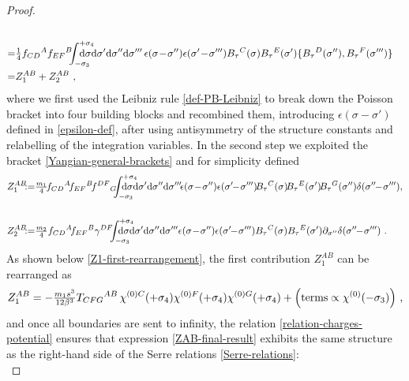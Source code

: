 \documentclass[12pt]{article}
\numberwithin{equation}{section}
\begin{document}
\begin{proof}
\begin{align}
\notag \\
=&\tfrac{1}{4}f_{CD}{}^{A}f_{EF}{}^{B}\!\!\!\int_{-\sigma_{3}}^{+\sigma_{4}}\!\!\!\!\!\!\!\!\!\!\mathrm{d}\sigma\mathrm{d}\sigma' \mathrm{d}\sigma'' \mathrm{d}\sigma''' \, \epsilon(\sigma\!-\!\sigma'')\epsilon(\sigma'\!-\!\sigma''')B_{\tau}{}^{C}(\sigma)B_{\tau}{}^{E}(\sigma')\{B_{\tau}{}^{D}(\sigma''),B_{\tau}{}^{F}(\sigma''')\}
\notag\\
=&Z_{1}^{AB}+Z_{2}^{AB} \,\, ,
\end{align}
where we first used the Leibniz rule \eqref{def-PB-Leibniz} to break down the Poisson bracket into four building blocks and recombined them, introducing $\epsilon(\sigma-\sigma')$ defined in \eqref{epsilon-def}, after using antisymmetry of the structure constants and relabelling of the integration variables. In the second step we exploited the bracket \eqref{Yangian-general-brackets} and for simplicity defined 
\begin{align}\label{Z1-Z2-def}
Z_{1}^{AB}\!\!\!:=&\tfrac{m_{1}}{4}\!f_{CD}{}^{A}\!f_{EF}{}^{B}\!f^{DF}{}_{G}\!\!\!\int_{-\sigma_{3}}^{+\sigma_{4}}\!\!\!\!\!\!\!\!\!\!\!\mathrm{d}\sigma\mathrm{d}\sigma' \mathrm{d}\sigma'' \mathrm{d}\sigma'''  \!\epsilon(\sigma\!-\!\sigma'')\epsilon(\sigma'\!\!-\!\sigma''')\!B_{\tau}{}^{C}(\sigma)\!B_{\tau}{}^{E}(\sigma')\!B_{\tau}{}^{G}(\sigma'')\delta(\sigma''\!\!-\!\sigma''') ,
\notag \\
\\
Z_{2}^{AB}\!\!\!:=&\tfrac{m_{2}}{4}f_{CD}{}^{A}\!f_{EF}{}^{B}\gamma^{DF}\!\!\!\int_{-\sigma_{3}}^{+\sigma_{4}}\!\!\!\!\!\!\!\!\!\!\!\mathrm{d}\sigma\mathrm{d}\sigma' \mathrm{d}\sigma''\mathrm{d}\sigma'''   \epsilon(\sigma\!-\!\sigma'')\epsilon(\sigma'\!\!-\!\sigma''')B_{\tau}{}^{C}(\sigma)B_{\tau}{}^{E}(\sigma')\partial_{\sigma''}\delta(\sigma''\!\!-\!\sigma''') \,\, .
\notag 
\end{align}
As shown below \eqref{Z1-first-rearrangement}, the first contribution $Z_{1}^{AB}$ can be rearranged as 
\begin{equation}\label{ZAB-final-result}
Z_{1}^{AB}=-\tfrac{m_{1}s^3}{12\beta^3}T_{CFG}{}^{AB} \, \chi^{(0)C}(+\sigma_{4}) \chi^{(0)F}(+\sigma_{4}) \chi^{(0)G}(+\sigma_{4}) +\Bigl(\text{terms}\propto\chi^{(0)}(-\sigma_{3})\Bigr) \,\, ,
\end{equation}
and once all boundaries are sent to infinity, the relation \eqref{relation-charges-potential} ensures that expression \eqref{ZAB-final-result} exhibits the same structure as the right-hand side of the Serre relations \eqref{Serre-relations}:
\begin{equation}

\end{equation}
\end{proof}
\end{document}
